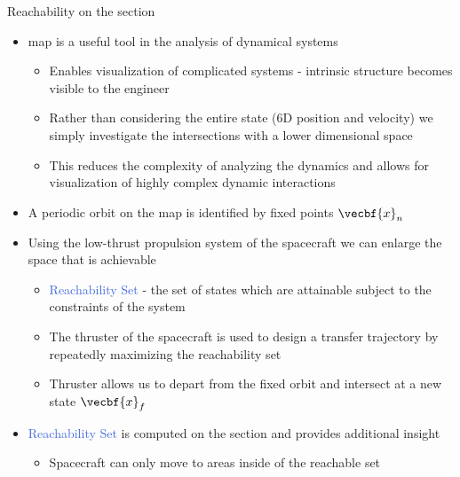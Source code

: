 \documentclass[final, usenames, dvipsnames]{beamer}
\newlength{\onecolwidth}
\def\Emph{\textcolor{RoyalBlue}}
\begin{document}
\begin{frame}[t]
\begin{columns}[T]
\begin{column}{\onecolwidth}
\begin{block}{Reachability on the \Poincare section}
    \begin{itemize}
        \item \Emph{\Poincare} map is a useful tool in the analysis of dynamical systems
        \begin{itemize}
            \item Enables visualization of complicated systems - intrinsic structure becomes visible to the engineer
            \item Rather than considering the entire state (6D position and velocity) we simply investigate the intersections with a lower dimensional space
            \item This reduces the complexity of analyzing the dynamics and allows for visualization of highly complex dynamic interactions
        \end{itemize} 
        \item A periodic orbit on the \Poincare map is identified by fixed points \( \vecbf{x}_n\)
        \item Using the low-thrust propulsion system of the spacecraft we can enlarge the space that is achievable 
        \begin{itemize}
            \item \Emph{Reachability Set} - the set of states which are attainable subject to the constraints of the system
            \item The thruster of the spacecraft is used to design a transfer trajectory by repeatedly maximizing the reachability set
            \item Thruster allows us to depart from the fixed orbit and intersect at a new state \( \vecbf{x}_f\)
        \end{itemize}
        \item \Emph{Reachability Set} is computed on the \Poincare section and provides additional insight
        \begin{itemize}
            \item Spacecraft can only move to areas inside of the reachable set
        \end{itemize}
    \end{itemize}

\end{block} %


\end{column}
\end{columns}
\end{frame}
\end{document}

